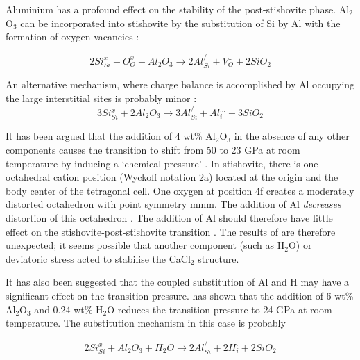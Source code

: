 \documentclass[review]{elsarticle}
\begin{document}
Aluminium has a profound effect on the stability of the post-stishovite phase. Al$_2$O$_3$ can be incorporated into stishovite by the substitution of Si by Al with the formation of oxygen vacancies \citep{SSP1995,HTSO2005,BBB2006}:

\begin{equation}
2Si^x_{Si} + O^x_O + Al_2O_3 \rightarrow 2Al^/_{Si} + V^{..}_O + 2SiO_2
\end{equation}

An alternative mechanism, where charge balance is accomplished by Al occupying the large interstitial sites is probably minor \cite{SSP1995}:
\begin{equation}
3Si^x_{Si} + 2Al_2O_3 \rightarrow 3Al^/_{Si} + Al^{...}_i + 3SiO_2
\end{equation}

It has been argued that the addition of 4 wt\% Al$_2$O$_3$ in the absence of any other components causes the transition to shift from 50 to 23 GPa at room temperature by inducing a `chemical pressure' \citep{BAAG2009}. In stishovite, there is one octahedral cation position (Wyckoff notation 2a) located at the origin and the body center of the tetragonal cell. One oxygen at position 4f creates a moderately distorted octahedron with point symmetry mmm. The addition of Al \emph{decreases} distortion of this octahedron \citep{SSP1995}. The addition of Al should therefore have little effect on the stishovite-post-stishovite transition \citep{Panero2006}. The results of \cite{BAAG2009} are therefore unexpected; it seems possible that another component (such as H$_2$O) or deviatoric stress acted to stabilise the CaCl$_2$ structure.

It has also been suggested that the coupled substitution of Al and H may have a significant effect on the transition pressure. \cite{Lakshtanovetal2007} has shown that the addition of 6 wt\% Al$_2$O$_3$ and 0.24 wt\% H$_2$O reduces the transition pressure to 24 GPa at room temperature. The substitution mechanism in this case is probably

\begin{equation}
2Si^x_{Si} + Al_2O_3 + H_2O \rightarrow 2Al^/_{Si} + 2H^{.}_i + 2SiO_2
\end{equation}
\end{document}
